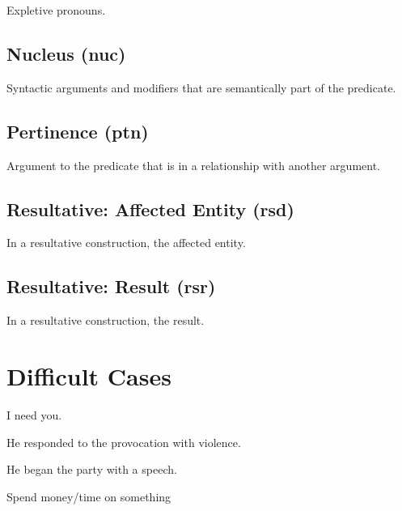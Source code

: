 \documentclass[a4paper]{article}
\begin{document}
Expletive pronouns.

\subsection{Nucleus (nuc)}

Syntactic arguments and modifiers that are semantically part of the predicate.

\subsection{Pertinence (ptn)}

Argument to the predicate that is in a relationship with another argument.

\subsection{Resultative: Affected Entity (rsd)}

In a resultative construction, the affected entity.

\subsection{Resultative: Result (rsr)}

In a resultative construction, the result.

\section{Difficult Cases}

I need you.

He responded to the provocation with violence.

He began the party with a speech.

Spend money/time on something
\end{document}
